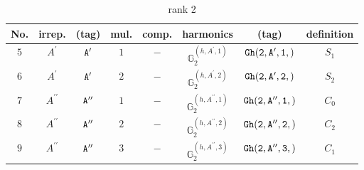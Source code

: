 \documentclass[fleqn,8pt]{jsarticle}
\begin{document}
\begin{table}[ht!]
\begin{center}
\caption{rank 2}
\renewcommand{\arraystretch}{1.3}
\begin{tabular}{cccccccc} \hline \hline
No. & irrep. & (tag) & mul. & comp. & harmonics & (tag) & definition \\ \hline
$ 5 $ & $ A^{\prime} $ & $ {\tt A'} $ & $ 1 $ & $ - $ & $ \mathbb{G}_{2}^{(h,A^{\prime},1)} $ & $ {\tt Gh(2,A',1,)} $ & $ S_{1} $ \\
$ 6 $ & $ A^{\prime} $ & $ {\tt A'} $ & $ 2 $ & $ - $ & $ \mathbb{G}_{2}^{(h,A^{\prime},2)} $ & $ {\tt Gh(2,A',2,)} $ & $ S_{2} $ \\
$ 7 $ & $ A^{\prime\prime} $ & $ {\tt A''} $ & $ 1 $ & $ - $ & $ \mathbb{G}_{2}^{(h,A^{\prime\prime},1)} $ & $ {\tt Gh(2,A'',1,)} $ & $ C_{0} $ \\
$ 8 $ & $ A^{\prime\prime} $ & $ {\tt A''} $ & $ 2 $ & $ - $ & $ \mathbb{G}_{2}^{(h,A^{\prime\prime},2)} $ & $ {\tt Gh(2,A'',2,)} $ & $ C_{2} $ \\
$ 9 $ & $ A^{\prime\prime} $ & $ {\tt A''} $ & $ 3 $ & $ - $ & $ \mathbb{G}_{2}^{(h,A^{\prime\prime},3)} $ & $ {\tt Gh(2,A'',3,)} $ & $ C_{1} $ \\
 \hline \hline
\end{tabular}
\end{center}
\end{table}
\end{document}

